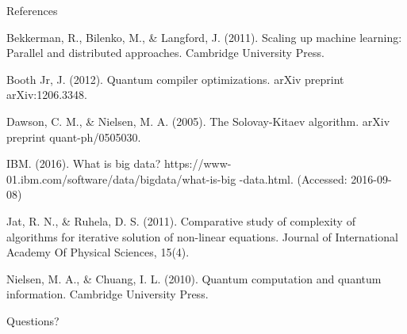 \documentclass[10pt]{beamer}
\begin{document}
\begin{frame}{References}

\footnotesize{Bekkerman, R., Bilenko, M., \& Langford, J. (2011). Scaling up machine learning: Parallel and distributed
approaches. Cambridge University Press.\newline

Booth Jr, J. (2012). Quantum compiler optimizations. arXiv preprint arXiv:1206.3348.

Dawson, C. M., \& Nielsen, M. A. (2005). The Solovay-Kitaev algorithm. arXiv preprint quant-ph/0505030.\newline

IBM. (2016). What is big data? https://www-01.ibm.com/software/data/bigdata/what-is-big
-data.html. (Accessed: 2016-09-08) \newline

Jat, R. N., \& Ruhela, D. S. (2011). Comparative study of complexity of algorithms for iterative solution of non-linear equations. Journal of International Academy Of Physical Sciences, 15(4).\newline

Nielsen, M. A., \& Chuang, I. L. (2010). Quantum computation and quantum information. Cambridge University Press.}
\end{frame}

\begin{frame}[standout]
  Questions?
\end{frame}
\end{document}
